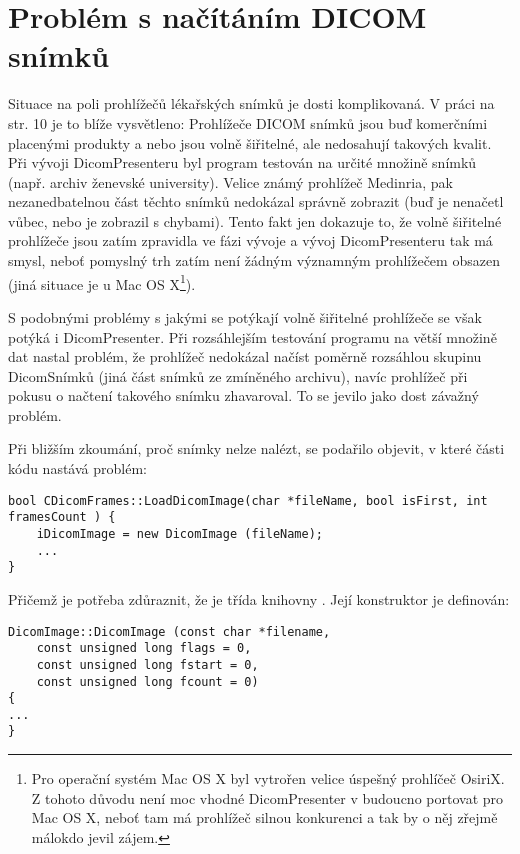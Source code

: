 \section{Problém s načítáním DICOM snímků}
Situace na poli prohlížečů lékařských snímků je dosti komplikovaná. V práci\cite{flaska} na str. 10 je to blíže vysvětleno: Prohlížeče DICOM snímků jsou buď komerčními placenými produkty a nebo jsou volně šiřitelné, ale nedosahují takových kvalit. Při vývoji DicomPresenteru byl program testován na určité množině snímků (např. archiv ženevské university). Velice známý prohlížeč Medinria, pak nezanedbatelnou část těchto snímků nedokázal správně zobrazit (buď je nenačetl vůbec, nebo je zobrazil s chybami). Tento fakt jen dokazuje to, že volně šiřitelné prohlížeče jsou zatím zpravidla ve fázi vývoje a vývoj DicomPresenteru tak má smysl, neboť pomyslný trh zatím není žádným významným prohlížečem obsazen (jiná situace je u Mac OS X\footnote{Pro operační systém Mac OS X byl vytrořen velice úspešný prohlíčeč OsiriX. Z tohoto důvodu není moc vhodné DicomPresenter v budoucno portovat pro Mac OS X, neboť tam má prohlížeč silnou konkurenci a tak by o něj zřejmě málokdo jevil zájem.}).

S podobnými problémy s jakými se potýkají volně šiřitelné prohlížeče se však potýká i DicomPresenter. Při rozsáhlejším testování programu na větší množině dat nastal problém, že prohlížeč nedokázal načíst poměrně rozsáhlou skupinu DicomSnímků (jiná část snímků ze zmíněného archivu), navíc prohlížeč při pokusu o načtení takového snímku zhavaroval. To se jevilo jako dost závažný problém.

Při bližším zkoumání, proč snímky nelze nalézt, se podařilo objevit, v které části kódu nastává problém:

\begin{lstlisting}[label=DicomImageClass,caption={První část souboru \texttt{Window.cpp} se zdrojovým kódem třídy reprezentující okno programu.}]
bool CDicomFrames::LoadDicomImage(char *fileName, bool isFirst, int framesCount ) {
	iDicomImage = new DicomImage (fileName);
	...	
}
\end{lstlisting}

Přičemž je potřeba zdůraznit, že  je třída knihovny . Její konstruktor je definován:
\begin{lstlisting}[label={DicomImage}]
DicomImage::DicomImage (const char *filename,
    const unsigned long flags = 0,
    const unsigned long fstart = 0,
    const unsigned long fcount = 0)
{
...
}
\end{lstlisting}

